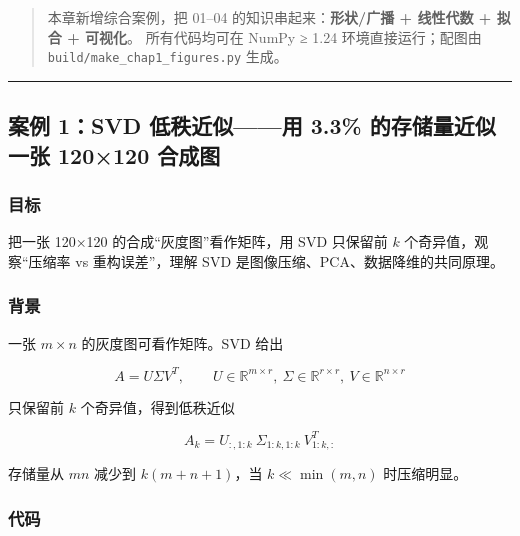 \begin{quote}
本章新增综合案例，把 01--04 的知识串起来：\textbf{形状/广播 + 线性代数 +
拟合 + 可视化}。 所有代码均可在 NumPy ≥ 1.24 环境直接运行；配图由
\texttt{build/make\_chap1\_figures.py} 生成。
\end{quote}

\begin{center}\rule{0.5\linewidth}{0.5pt}\end{center}

\subsection{案例 1：SVD 低秩近似------用 3.3\% 的存储量近似一张 120×120
合成图}\label{ux6848ux4f8b-1svd-ux4f4eux79e9ux8fd1ux4f3cux7528-3.3-ux7684ux5b58ux50a8ux91cfux8fd1ux4f3cux4e00ux5f20-120120-ux5408ux6210ux56fe}

\subsubsection{目标}\label{ux76eeux6807-9}

把一张 120×120 的合成``灰度图''看作矩阵，用 SVD 只保留前 \(k\)
个奇异值，观察``压缩率 vs 重构误差''，理解 SVD
是图像压缩、PCA、数据降维的共同原理。

\subsubsection{背景}\label{ux80ccux666f}

一张 \(m \times n\) 的灰度图可看作矩阵。SVD 给出

\[
A = U \Sigma V^T,\qquad U\in\mathbb{R}^{m\times r},\ \Sigma\in\mathbb{R}^{r\times r},\ V\in\mathbb{R}^{n\times r}
\]

只保留前 \(k\) 个奇异值，得到低秩近似

\[
A_k = U_{:,1:k}\ \Sigma_{1:k,1:k}\ V_{1:k,:}^T
\]

存储量从 \(m n\) 减少到 \(k(m+n+1)\)，当 \(k\ll \min(m,n)\) 时压缩明显。

\subsubsection{代码}\label{ux4ee3ux7801-9}

